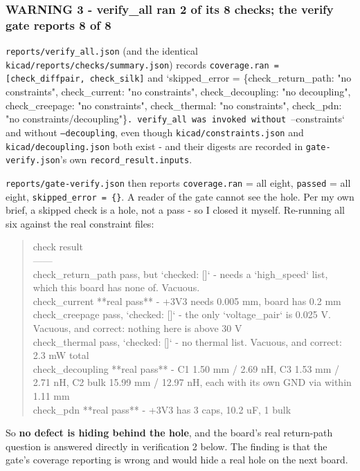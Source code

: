\documentclass[11pt,a4paper]{article}
\begin{document}
\subsubsection*{WARNING 3 - verify\_all ran 2 of its 8 checks; the verify gate reports 8 of 8}
\texttt{reports/verify\_all.json} (and the identical \texttt{kicad/reports/checks/summary.json}) records \texttt{coverage.ran = {[}check\_diffpair, check\_silk{]}} and `skipped\_error = \{check\_return\_path: "no constraints", check\_current: "no constraints", check\_decoupling: "no decoupling", check\_creepage: "no constraints", check\_thermal: "no constraints", check\_pdn: "no constraints/decoupling"\}\texttt{. verify\_all was invoked without }--constraints` and without \texttt{--decoupling}, even though \texttt{kicad/constraints.json} and \texttt{kicad/decoupling.json} both exist - and their digests are recorded in \texttt{gate-verify.json}'s own \texttt{record\_result.inputs}.

\texttt{reports/gate-verify.json} then reports \texttt{coverage.ran} = all eight, \texttt{passed} = all eight, \texttt{skipped\_error = \{\}}. A reader of the gate cannot see the hole. Per my own brief, a skipped check is a hole, not a pass - so I closed it myself. Re-running all six against the real constraint files:

\begin{quote}\small\ttfamily\raggedright
\textbar{} check \textbar{} result \textbar{}\\
\textbar{}---\textbar{}---\textbar{}\\
\textbar{} check\_return\_path \textbar{} pass, but `checked: {[}{]}` - needs a `high\_speed` list, which this board has none of. Vacuous. \textbar{}\\
\textbar{} check\_current \textbar{} {*}{*}real pass{*}{*} - +3V3 needs 0.005 mm, board has 0.2 mm \textbar{}\\
\textbar{} check\_creepage \textbar{} pass, `checked: {[}{]}` - the only `voltage\_pair` is 0.025 V. Vacuous, and correct: nothing here is above 30 V \textbar{}\\
\textbar{} check\_thermal \textbar{} pass, `checked: {[}{]}` - no thermal list. Vacuous, and correct: 2.3 mW total \textbar{}\\
\textbar{} check\_decoupling \textbar{} {*}{*}real pass{*}{*} - C1 1.50 mm / 2.69 nH, C3 1.53 mm / 2.71 nH, C2 bulk 15.99 mm / 12.97 nH, each with its own GND via within 1.11 mm \textbar{}\\
\textbar{} check\_pdn \textbar{} {*}{*}real pass{*}{*} - +3V3 has 3 caps, 10.2 uF, 1 bulk \textbar{}
\end{quote}
So \textbf{no defect is hiding behind the hole}, and the board's real return-path question is answered directly in verification 2 below. The finding is that the gate's coverage reporting is wrong and would hide a real hole on the next board.
\end{document}
